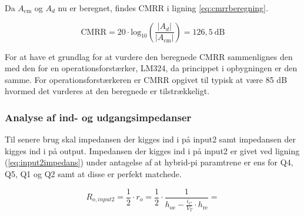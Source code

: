 Da $A_\mathrm{cm}$ og $A_d$ nu er beregnet, findes CMRR i ligning \ref{eq:cmrrberegning}.

\begin{equation}
\mathrm{CMRR}=20 \cdot \mathrm{log}_10 \left( \frac{|A_d|}{|A_\mathrm{cm}|}\right)=126,5~\mathrm{dB}
\label{eq:cmrrberegning}
\end{equation}

For at have et grundlag for at vurdere den beregnede CMRR sammenlignes den med den for en operationsforstærker, LM324, da princippet i opbygningen er den samme. For operationsforstærkeren er CMRR opgivet til typisk at være 85 dB hvormed det vurderes at den beregnede er tilstrækkeligt. 

\subsubsection*{Analyse af ind- og udgangsimpedanser}
Til senere brug skal impedansen der kigges ind i på input2 samt impedansen der kigges ind i på output. 
Impedansen der kigges ind i på input2 er givet ved ligning (\ref{eq:input2impedans}) under antagelse af at hybrid-pi paramtrene er ens for Q4, Q5, Q1 og Q2 samt at disse er perfekt matchede. 

\begin{equation}
R_{o, input2}=\frac{1}{2} \cdot r_o = \frac{1}{2} \cdot \frac{1}{h_\mathrm{oe} - \frac{i_C}{V_T} \cdot h_\mathrm{re}} = 
\label{eq:input2impedans}
\end{equation}
